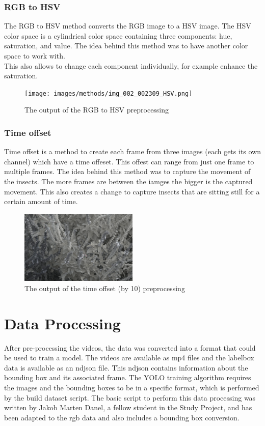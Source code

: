 \subsubsection{RGB to HSV} 
The RGB to HSV method converts the RGB image to a HSV image. The HSV color space is a cylindrical color space containing three components: hue, saturation, and value. The idea behind this method was to have another color space to work with.\\
This also allows to change each component individually, for example enhance the saturation.

\begin{figure}[h]
    \centering
    \texttt{[image: images/methods/img\_002\_002309\_HSV.png]}
    \caption{The output of the RGB to HSV preprocessing}
\end{figure}

\subsubsection{Time offset} 
Time offset is a method to create each frame from three images (each gets its own channel) which have a time offeset. This offest can range from just one frame to multiple frames. The idea behind this method was to capture the movement of the insects. The more frames are between the iamges the bigger is the captured movement. This also creates a change to capture insects that are sitting still for a certain amount of time.

\begin{figure}[h]
    \centering
    \includegraphics[width=0.5\textwidth]{images/methods/img_002_002309_OffsetBy10.png}
    \caption{The output of the time offset (by 10) preprocessing}
\end{figure}

\section{Data Processing}

After pre-processing the videos, the data was converted into a format that could be used to train a model. The videos are available as mp4 files and the labelbox data is available as an ndjson file. This ndjson contains information about the bounding box and its associated frame. The YOLO training algorithm requires the images and the bounding boxes to be in a specific format, which is performed by the build dataset script. The basic script to perform this data processing was written by Jakob Marten Danel, a fellow student in the Study Project, and has been adapted to the rgb data and also includes a bounding box conversion. 

